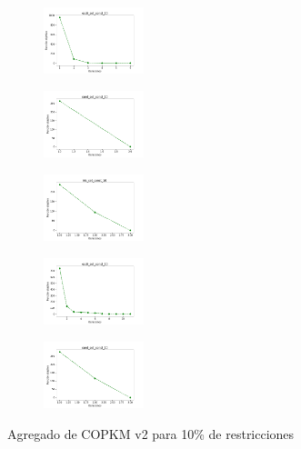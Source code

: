 \begin{figure}[H]
\begin{subfigure}
    \end{subfigure}
    \hfill
    \begin{subfigure}
        \centering
        \includegraphics[width=0.32\textwidth]{img/copkm2/ecoli_set_const_10_49258669_cost.png}
    \end{subfigure}
    \hfill
    \begin{subfigure}
        \centering
        \includegraphics[width=0.32\textwidth]{img/copkm2/rand_set_const_10_49258669_cost.png}
    \end{subfigure}
    \hfill
    \begin{subfigure}
        \centering
        \includegraphics[width=0.32\textwidth]{img/copkm2/iris_set_const_10_3773969821_cost.png}
    \end{subfigure}
    \hfill
    \begin{subfigure}
        \centering
        \includegraphics[width=0.32\textwidth]{img/copkm2/ecoli_set_const_10_3773969821_cost.png}
    \end{subfigure}
    \hfill
    \begin{subfigure}
        \centering
        \includegraphics[width=0.32\textwidth]{img/copkm2/rand_set_const_10_3773969821_cost.png}
    \end{subfigure}
    \caption{Agregado de COPKM v2 para 10\% de restricciones}
\end{figure}

